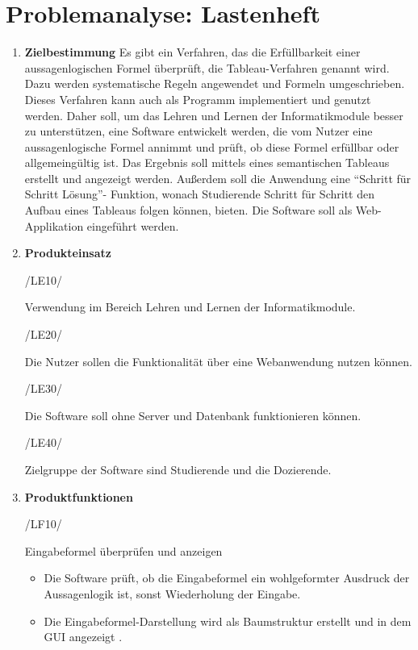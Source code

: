 \section{Problemanalyse: Lastenheft}
\begin{enumerate}
\item \textbf{Zielbestimmung}
Es gibt ein Verfahren, das die Erfüllbarkeit einer aussagenlogischen Formel überprüft, die Tableau-Verfahren genannt wird.
Dazu werden systematische Regeln angewendet und Formeln umgeschrieben. Dieses Verfahren kann auch als Programm implementiert und genutzt werden. Daher soll, um das Lehren und Lernen der Informatikmodule besser zu unterstützen, eine Software entwickelt werden, die vom Nutzer eine aussagenlogische Formel annimmt und prüft, ob diese Formel erfüllbar oder allgemeingültig ist. Das Ergebnis soll mittels eines semantischen Tableaus erstellt und angezeigt werden. Außerdem soll die Anwendung eine ``Schritt für Schritt Lösung''- Funktion, wonach Studierende Schritt für Schritt den Aufbau eines Tableaus folgen können, bieten. Die Software soll als Web-Applikation eingeführt werden.

\item \textbf{Produkteinsatz}

\hypertarget{/LE10/}{/LE10/} Verwendung im Bereich Lehren und Lernen der Informatikmodule.

\hypertarget{/LE20/}{/LE20/} Die Nutzer sollen die Funktionalität über eine Webanwendung nutzen können.	

\hypertarget{/LE30/}{/LE30/} Die Software soll ohne Server und Datenbank funktionieren können.

\hypertarget{/LE40/}{/LE40/} Zielgruppe der Software sind Studierende und die Dozierende.

\item \textbf{Produktfunktionen}

\hypertarget{/LF10/}{/LF10/} Eingabeformel überprüfen und anzeigen
\begin{itemize} 
\item Die Software prüft, ob die Eingabeformel ein wohlgeformter Ausdruck der Aussagenlogik ist, sonst Wiederholung der Eingabe.
\item Die Eingabeformel-Darstellung wird als Baumstruktur erstellt und in dem GUI angezeigt .
\end{itemize}



\end{enumerate}
